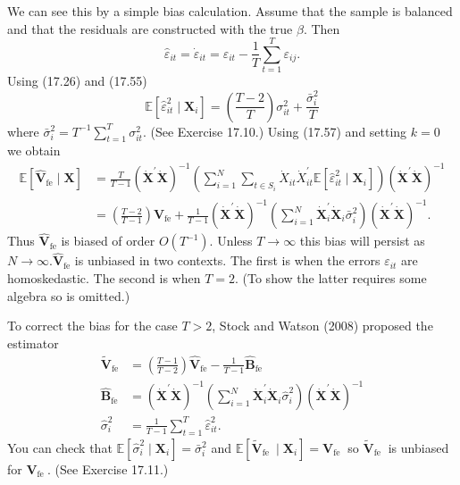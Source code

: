 \documentclass[10pt]{article}
\begin{document}
We can see this by a simple bias calculation. Assume that the sample is balanced and that the residuals are constructed with the true $\beta$. Then
$$
\widehat{\varepsilon}_{i t}=\dot{\varepsilon}_{i t}=\varepsilon_{i t}-\frac{1}{T} \sum_{t=1}^{T} \varepsilon_{i j} .
$$
Using (17.26) and (17.55)
$$
\mathbb{E}\left[\widehat{\varepsilon}_{i t}^{2} \mid \boldsymbol{X}_{i}\right]=\left(\frac{T-2}{T}\right) \sigma_{i t}^{2}+\frac{\bar{\sigma}_{i}^{2}}{T}
$$
where $\bar{\sigma}_{i}^{2}=T^{-1} \sum_{t=1}^{T} \sigma_{i t}^{2}$. (See Exercise 17.10.) Using (17.57) and setting $k=0$ we obtain
$$
\begin{aligned}
\mathbb{E}\left[\widehat{\boldsymbol{V}}_{\mathrm{fe}} \mid \boldsymbol{X}\right] &=\frac{T}{T-1}\left(\dot{\boldsymbol{X}}^{\prime} \dot{\boldsymbol{X}}\right)^{-1}\left(\sum_{i=1}^{N} \sum_{t \in S_{i}} \dot{X}_{i t} \dot{X}_{i t}^{\prime} \mathbb{E}\left[\widehat{\varepsilon}_{i t}^{2} \mid \boldsymbol{X}_{i}\right]\right)\left(\dot{\boldsymbol{X}}^{\prime} \dot{\boldsymbol{X}}\right)^{-1} \\
&=\left(\frac{T-2}{T-1}\right) \boldsymbol{V}_{\mathrm{fe}}+\frac{1}{T-1}\left(\dot{\boldsymbol{X}}^{\prime} \dot{\boldsymbol{X}}\right)^{-1}\left(\sum_{i=1}^{N} \dot{\boldsymbol{X}}_{i}^{\prime} \dot{\boldsymbol{X}}_{i} \bar{\sigma}_{i}^{2}\right)\left(\dot{\boldsymbol{X}}^{\prime} \dot{\boldsymbol{X}}\right)^{-1} .
\end{aligned}
$$
Thus $\widehat{\boldsymbol{V}}_{\mathrm{fe}}$ is biased of order $O\left(T^{-1}\right)$. Unless $T \rightarrow \infty$ this bias will persist as $N \rightarrow \infty . \widehat{\boldsymbol{V}}_{\mathrm{fe}}$ is unbiased in two contexts. The first is when the errors $\varepsilon_{i t}$ are homoskedastic. The second is when $T=2$. (To show the latter requires some algebra so is omitted.)

To correct the bias for the case $T>2$, Stock and Watson (2008) proposed the estimator
$$
\begin{aligned}
\widetilde{\boldsymbol{V}}_{\mathrm{fe}} &=\left(\frac{T-1}{T-2}\right) \widehat{\boldsymbol{V}}_{\mathrm{fe}}-\frac{1}{T-1} \widehat{\boldsymbol{B}}_{\mathrm{fe}} \\
\widehat{\boldsymbol{B}}_{\mathrm{fe}} &=\left(\dot{\boldsymbol{X}}^{\prime} \dot{\boldsymbol{X}}\right)^{-1}\left(\sum_{i=1}^{N} \dot{\boldsymbol{X}}_{i}^{\prime} \dot{\boldsymbol{X}}_{i} \widehat{\sigma}_{i}^{2}\right)\left(\dot{\boldsymbol{X}}^{\prime} \dot{\boldsymbol{X}}\right)^{-1} \\
\widehat{\sigma}_{i}^{2} &=\frac{1}{T-1} \sum_{t=1}^{T} \widehat{\varepsilon}_{i t}^{2} .
\end{aligned}
$$
You can check that $\mathbb{E}\left[\widehat{\sigma}_{i}^{2} \mid \boldsymbol{X}_{i}\right]=\bar{\sigma}_{i}^{2}$ and $\mathbb{E}\left[\widetilde{\boldsymbol{V}}_{\text {fe }} \mid \boldsymbol{X}_{i}\right]=\boldsymbol{V}_{\text {fe }}$ so $\widetilde{\boldsymbol{V}}_{\text {fe }}$ is unbiased for $\boldsymbol{V}_{\text {fe }}$. (See Exercise 17.11.)
\end{document}
